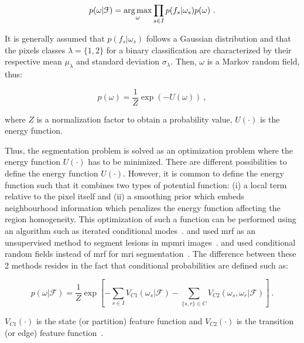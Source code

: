 \begin{equation}
	p(\omega|\mathcal{F}) = \operatorname*{arg\,max}_{\omega} \prod_{s \in I} p(f_s | \omega_s) p(\omega) \ .
	\label{eq:mrf1}
\end{equation}

It is generally assumed that $p(f_s | \omega_s)$ follows a Gaussian distribution and that the pixels classes $\lambda = \{1,2\}$ for a binary classification are characterized by their respective mean $\mu_{\lambda}$ and standard deviation $\sigma_{\lambda}$.
Then, $\omega$ is a Markov random field, thus:

\begin{equation}
	p(\omega) =  \frac{1}{Z} \exp\left( -U(\omega) \right)  \ ,
	\label{eq:mrf2}
\end{equation}

\noindent where $Z$ is a normalization factor to obtain a probability value, $U(\cdot)$ is the energy function.

Thus, the segmentation problem is solved as an optimization problem where the energy function $U(\cdot)$ has to be minimized.
There are different possibilities to define the energy function $U(\cdot)$.
However, it is common to define the energy function such that it combines two types of potential function: (i) a local term relative to the pixel itself and (ii) a smoothing prior which embeds neighbourhood information which penalizes the energy function affecting the region homogeneity.
This optimization of such a function can be performed using an algorithm such as iterated conditional modes~\cite{Kato2001}.
\citeauthor{Liu2009} and \citeauthor{Ozer2010} used \ac{mrf} as an unsupervised method to segment lesions in \ac{mpmri} images~\cite{Liu2009,Ozer2010}.
\citeauthor{Artan2010} and \citeauthor{chung2015prostate} used conditional random fields instead of \ac{mrf} for \ac{mri} segmentation~\cite{Artan2009,Artan2010,chung2015prostate}.
The difference between these 2 methods resides in the fact that conditional probabilities are defined such as:

\begin{equation}
	p(\omega|\mathcal{F}) =  \frac{1}{Z} \exp \left[ - \sum_{s \in I} V_{C1}(\omega_s|\mathcal{F}) - \sum_{\{s,r\} \in C } V_{C2} (\omega_s,\omega_r|\mathcal{F})  \right] \ .
\label{eq:crf}
\end{equation}

\noindent $V_{C1}(\cdot)$ is the state (or partition) feature function and $V_{C2}(\cdot)$ is the transition (or edge) feature function~\cite{Kato2012}.

